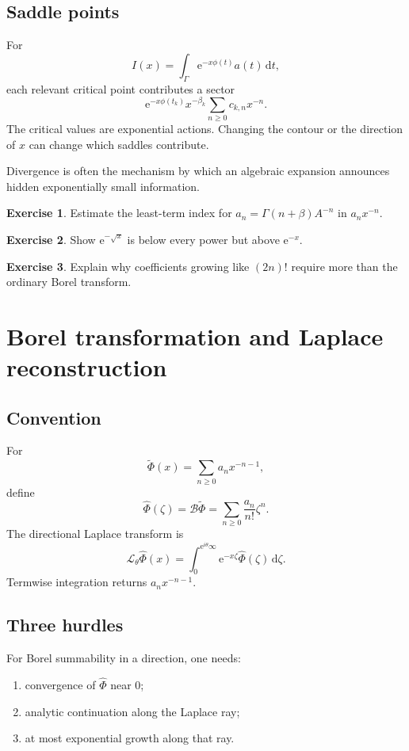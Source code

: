 \documentclass[11pt,oneside,openany]{book}
\newcommand{\e}{\mathrm{e}}
\newcommand{\dd}{\,\mathrm{d}}
\newcommand{\Borel}{\mathcal{B}}
\newcommand{\Laplace}{\mathcal{L}}
\theoremstyle{plain}
\theoremstyle{definition}
\newtheorem{exercise}{Exercise}[chapter]
\theoremstyle{remark}
\begin{document}
\section{Saddle points}
For
\[
  I(x)=\int_\Gamma\e^{-x\phi(t)}a(t)\dd t,
\]
each relevant critical point contributes a sector
\[
  \e^{-x\phi(t_k)}x^{-\beta_k}
  \sum_{n\ge0}c_{k,n}x^{-n}.
\]
The critical values are exponential actions. Changing the contour or the direction of $x$ can change which saddles contribute.

\begin{bigidea}
Divergence is often the mechanism by which an algebraic expansion announces hidden exponentially small information.
\end{bigidea}

\begin{exercise}
Estimate the least-term index for $a_n=\Gamma(n+\beta)A^{-n}$ in $a_nx^{-n}$.
\end{exercise}

\begin{exercise}
Show $\e^{-\sqrt{x}}$ is below every power but above $\e^{-x}$.
\end{exercise}

\begin{exercise}
Explain why coefficients growing like $(2n)!$ require more than the ordinary Borel transform.
\end{exercise}


\chapter{Borel transformation and Laplace reconstruction}
\label{ch:borel}

\section{Convention}
For
\[
  \widetilde\Phi(x)=\sum_{n\ge0}a_nx^{-n-1},
\]
define
\[
  \widehat\Phi(\zeta)=\Borel\widetilde\Phi
  =\sum_{n\ge0}\frac{a_n}{n!}\zeta^n.
\]
The directional Laplace transform is
\[
  \Laplace_\theta\widehat\Phi(x)
  =\int_0^{\e^{i\theta}\infty}
  \e^{-x\zeta}\widehat\Phi(\zeta)\dd\zeta.
\]
Termwise integration returns $a_nx^{-n-1}$.

\section{Three hurdles}
For Borel summability in a direction, one needs:
\begin{enumerate}
  \item convergence of $\widehat\Phi$ near $0$;
  \item analytic continuation along the Laplace ray;
  \item at most exponential growth along that ray.
\end{enumerate}
\end{document}
